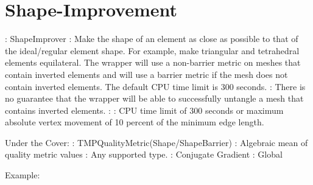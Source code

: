 \newpage

\section{Shape-Improvement} \label{sec:ShapeImprover}

: ShapeImprover \newline
{}: Make the shape of an element as close as possible to 
that of the ideal/regular element shape. For example, make triangular and 
tetrahedral elements equilateral.  The wrapper will use a non-barrier metric on meshes that contain inverted elements
and will use a barrier metric if the mesh does not contain inverted elements.  The default CPU time limit is 300 seconds.\newline 
{}: There is no guarantee that the wrapper will be able to successfully untangle a mesh that contains inverted elements.\newline
{}:  \newline 
{}: CPU time limit of 300 seconds or maximum absolute vertex movement of 10 percent of the minimum edge length. \newline \newline

\noindent Under the Cover: \newline
{}: TMPQualityMetric(Shape/ShapeBarrier) \newline
{}: Algebraic mean of quality metric values \newline
{}: Any supported type. \newline
{}: Conjugate Gradient \newline
{}: Global \newline

\noindent Example: \newline

